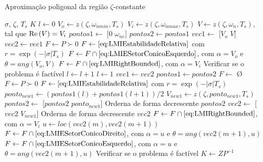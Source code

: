 \begin{algorithm}[ht!]
  \caption{Aproximação poligonal da região $\zeta$-constante}\label{alg:AproximacaoPoligonalZeta}
  \begin{algorithmic}[1]
    \Require $\sigma$, $\zeta$, $T_s$
    \Ensure $K$
    \State $l \gets 0$
    \State $V_o \gets z(\zeta,\omega_{nmin},T_s)$
    \State $V_i \gets z(\zeta,\omega_{nmax},T_s)$
    \State $V \gets z(\zeta,\omega_n,T_s)$, tal que $\operatorname{Re}{(V)} = V_i$
    \State $pontos1 \gets$ [$0$ $\omega_{ne}$]
    \State $pontos2 \gets pontos1$
    \State $vec1 \gets$ [$V_o$ $V$]
    \State $vec2 \gets vec1$
    \State $F \gets P \succ 0$
    \State $F \gets \eqref{eq:LMIEstabilidadeRelativa}$ com $r = \exp{\left(-|\sigma|T_s\right)}$ 
    \State $F \gets F \cap \eqref{eq:LMIESetorConicoEsquerdo}$, com $\alpha = V_o$ e $\theta = ang(V_o,V)$ 
    \State $F \gets F \cap \eqref{eq:LMIRightBounded}$, com $\alpha = V_i$ 
    \State Verificar se o problema é factível
        \State $l \gets l + 1$
      \Else
        \State $l \gets 1$
        \State $vec1 \gets vec2$
        \State $pontos1 \gets pontos2$
      \EndIf
        \State $F \gets$ \O {}
        \State $F \gets P \succ 0$
        \State $F \gets \eqref{eq:LMIEstabilidadeRelativa}$ com $r = \exp{\left(-|\sigma|T_s\right)}$ 
        \State $ponto_{new1} \gets (pontos1(l)+pontos1(l+1))/2$
        \State $V_{new1} \gets z(\zeta, ponto_{new1}, T_s)$
        \State $pontos2 \gets$ [$pontos2$ $ponto_{new1}$]
        \State Orderna de forma decrescente $pontos2$
        \State $vec2 \gets$ [$vec2$ $V_{new1}$]
        \State Orderna de forma decrescente $vec2$
        \State $F \gets F \cap \eqref{eq:LMIRightBounded}$, com $\alpha = V_i$ 
          \State $u \gets loc(vec2(m),vec2(m+1))$
            \State $F\gets F \cap \eqref{eq:LMIESetorConicoDireito}$, com $\alpha = u$ e $\theta = ang(vec2(m+1),u)$ 
          \Else
            \State $F\gets F \cap \eqref{eq:LMIESetorConicoEsquerdo}$, com $\alpha = u$ e $\theta = ang(vec2(m+1),u)$ 
          \EndIf
        \EndFor
        \State Verificar se o problema é factível 
    \EndWhile
    \State $K \gets ZP^{-1}$
  \end{algorithmic}
\end{algorithm} 

